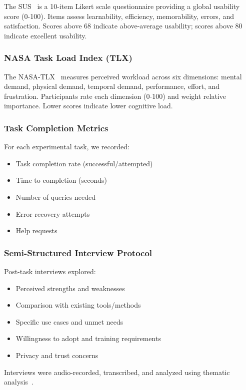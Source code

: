 \documentclass[acmlarge]{acmart}
\begin{document}
The SUS~\cite{Brooke1996} is a 10-item Likert scale questionnaire providing a global usability score (0-100). Items assess learnability, efficiency, memorability, errors, and satisfaction. Scores above 68 indicate above-average usability; scores above 80 indicate excellent usability.

\subsubsection{NASA Task Load Index (TLX)}

The NASA-TLX~\cite{Hart1988} measures perceived workload across six dimensions: mental demand, physical demand, temporal demand, performance, effort, and frustration. Participants rate each dimension (0-100) and weight relative importance. Lower scores indicate lower cognitive load.

\subsubsection{Task Completion Metrics}

For each experimental task, we recorded:
\begin{itemize}
    \item Task completion rate (successful/attempted)
    \item Time to completion (seconds)
    \item Number of queries needed
    \item Error recovery attempts
    \item Help requests
\end{itemize}

\subsubsection{Semi-Structured Interview Protocol}

Post-task interviews explored:
\begin{itemize}
    \item Perceived strengths and weaknesses
    \item Comparison with existing tools/methods
    \item Specific use cases and unmet needs
    \item Willingness to adopt and training requirements
    \item Privacy and trust concerns
\end{itemize}

Interviews were audio-recorded, transcribed, and analyzed using thematic analysis~\cite{Braun2006}.
\end{document}
